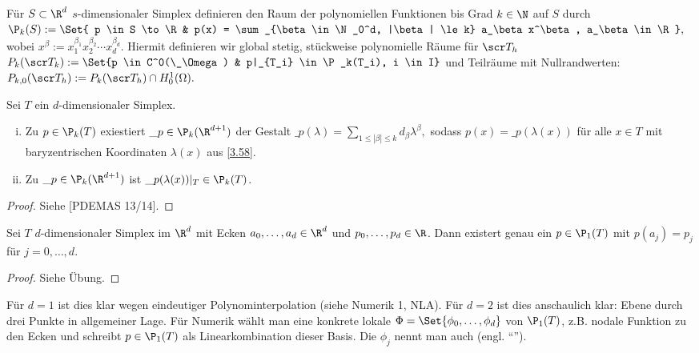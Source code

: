 \begin{df} \label{3.62}
	Für $S \subset \R^d$ $s$-dimensionaler Simplex definieren den Raum der polynomiellen Funktionen bis Grad $k \in \N$ auf $S$ durch
	\begin{math}
		\P_k(S) := \Set{ p \in S \to \R & p(x) = \sum_{\beta \in \N_0^d, |\beta| \le k} a_\beta x^\beta, a_\beta \in \R },
	\end{math}
	wobei $x^\beta := x_1^{\beta_1} x_2^{\beta_2} \dotsb x_d^{\beta_d}$.
	Hiermit definieren wir global stetig, stückweise polynomielle Räume für $\scr T_h$
	\begin{math}
		P_k(\scr T_k)
		:= \Set{p \in C^0(\_\Omega) & p|_{T_i} \in \P_k(T_i), i \in I}
	\end{math}
	und Teilräume mit Nullrandwerten:
	\begin{math}
		P_{k,0}(\scr T_h)
		:= P_k(\scr T_h) \cap H_0^1(\Omega).
	\end{math}
\end{df}

\begin{lem} \label{3.63}
	Sei $T$ ein $d$-dimensionaler Simplex.
	\begin{enumerate}[i)]
		\item
			Zu $p \in \P_k(T)$ exiestiert $\_p \in \P_k(\R^{d+1})$ der Gestalt
			\begin{math}
				\_p(\lambda) = \sum_{1 \le |\beta| \le k} d_\beta \lambda^\beta,
			\end{math}
			sodass $p(x) = \_p(\lambda(x))$ für alle $x \in T$ mit baryzentrischen Koordinaten $\lambda(x)$ aus \ref{3.58}.
		\item
			Zu $\_p \in \P_k(\R^{d+1})$ ist $\_p(\lambda(x))|_T \in \P_k(T)$.
	\end{enumerate}
	\begin{proof}
		Siehe [PDEMAS 13/14].
	\end{proof}
\end{lem}

\begin{st} \label{3.64}
	Sei $T$ $d$-dimensionaler Simplex im $\R^d$ mit Ecken $a_0, \dotsc, a_d \in \R^d$ und $p_0, \dotsc, p_d \in \R$.
	Dann existert genau ein $p \in \P_1(T)$ mit $p(a_j) = p_j$ für $j = 0, \dotsc, d$.
	\begin{proof}
		Siehe Übung.
	\end{proof}
	\begin{note}
		Für $d = 1$ ist dies klar wegen eindeutiger Polynominterpolation (siehe Numerik 1, NLA).
		Für $d = 2$ ist dies anschaulich klar: Ebene durch drei Punkte in allgemeiner Lage.
		Für Numerik wählt man eine konkrete lokale $\Phi = \Set{\phi_0, \dotsc, \phi_d}$ von $\P_1(T)$, z.B. nodale Funktion zu den Ecken und schreibt $p \in \P_1(T)$ als Linearkombination dieser Basis.
		Die $\phi_j$ nennt man auch  (engl. “”).
	\end{note}
\end{st}

